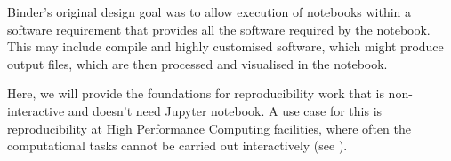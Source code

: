 \begin{task}
\begin{compactitem}
  Binder's original design goal was to allow execution of notebooks within a
  software requirement that provides all the software required by the notebook.
  This may include compile and highly customised software, which might produce
  output files, which are then processed and visualised in the notebook.

  Here, we will provide the foundations for reproducibility work that is
  non-interactive and doesn't need Jupyter notebook. A use case for this is
  reproducibility at High Performance Computing facilities, where often the
  computational tasks cannot be carried out interactively (see
  ).

    
  \end{compactitem}
\end{task}


% 
% 
% 
  

